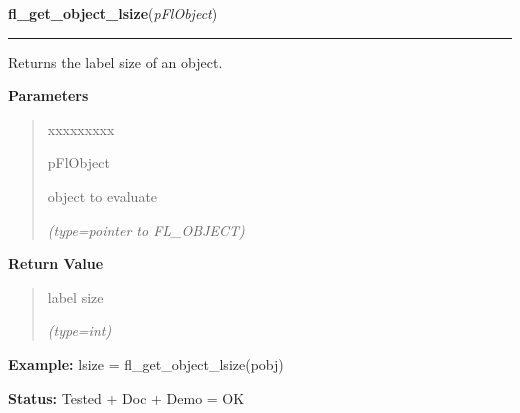     \vspace{0.5ex}

\hspace{.8\funcindent}\begin{boxedminipage}{\funcwidth}

    \raggedright \textbf{fl\_get\_object\_lsize}(\textit{pFlObject})

    \vspace{-1.5ex}

    \rule{\textwidth}{0.5\fboxrule}
\setlength{\parskip}{2ex}
    Returns the label size of an object.

\setlength{\parskip}{1ex}
      \textbf{Parameters}
      \vspace{-1ex}

      \begin{quote}
        \begin{Ventry}{xxxxxxxxx}

          \item[pFlObject]

          object to evaluate

            {\it (type=pointer to FL\_OBJECT)}

        \end{Ventry}

      \end{quote}

      \textbf{Return Value}
    \vspace{-1ex}

      \begin{quote}
      label size

      {\it (type=int)}

      \end{quote}

\textbf{Example:} lsize = fl\_get\_object\_lsize(pobj)



\textbf{Status:} Tested + Doc + Demo = OK



    \end{boxedminipage}

    \label{xformslib:flbasic:fl_set_object_lstyle}

    \vspace{0.5ex}

